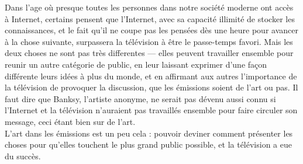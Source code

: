 \documentclass[12pt,a4paper]{article}
\begin{document}
Dans l'age où presque toutes les personnes dans notre société moderne
ont accès à Internet, certains pensent que l'Internet, avec sa
capacité illimité de stocker les connaissances, et le fait qu'il ne
coupe pas les pensées dès une heure pour avancer à la chose suivante,
surpassera la télévision à être le passe-temps favori. Mais les deux
choses ne sont pas très differentes --- elles peuvent travailler
ensemble pour reunir un autre catégorie de public, en leur laissant
exprimer d'une façon différente leurs idées à plus du monde, et en
affirmant aux autres l'importance de la télévision de provoquer la
discussion, que les émissions soient de l'art ou pas. Il faut dire que
Banksy, l'artiste anonyme, ne serait pas dévenu aussi connu si
l'Internet et la télévision n'auraient pas travaillés ensemble pour
faire circuler son message, ceci étant bien sur de l'art.\\

L'art dans les émissions est un peu cela : pouvoir deviner comment
présenter les choses pour qu'elles touchent le plus grand public
possible, et la télévision a eue du succès.
\end{document}
